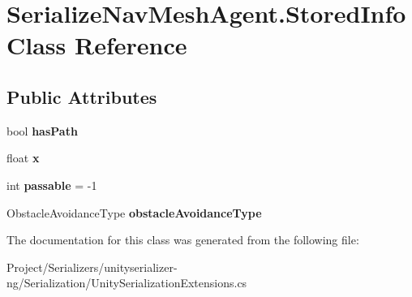 \hypertarget{class_serialize_nav_mesh_agent_1_1_stored_info}{}\section{Serialize\+Nav\+Mesh\+Agent.\+Stored\+Info Class Reference}
\label{class_serialize_nav_mesh_agent_1_1_stored_info}
\subsection*{Public Attributes}
\begin{DoxyCompactItemize}
\item 
\mbox{\label{class_serialize_nav_mesh_agent_1_1_stored_info_a22c390e4d774cb85933c1bc191c469ca}} 
bool {\bfseries has\+Path}
\item 
\mbox{\label{class_serialize_nav_mesh_agent_1_1_stored_info_a67ba07515a06b4bf79e95c9b312a49cc}} 
float {\bfseries x}
\item 
\mbox{\label{class_serialize_nav_mesh_agent_1_1_stored_info_ae37352696e63a839067ea3ad8654b38b}} 
int {\bfseries passable} = -\/1
\item 
\mbox{\label{class_serialize_nav_mesh_agent_1_1_stored_info_a5b52f98b4989bb553bc8d47677d75072}} 
Obstacle\+Avoidance\+Type {\bfseries obstacle\+Avoidance\+Type}
\end{DoxyCompactItemize}


The documentation for this class was generated from the following file\+:\begin{DoxyCompactItemize}
\item 
Project/\+Serializers/unityserializer-\/ng/\+Serialization/Unity\+Serialization\+Extensions.\+cs\end{DoxyCompactItemize}
